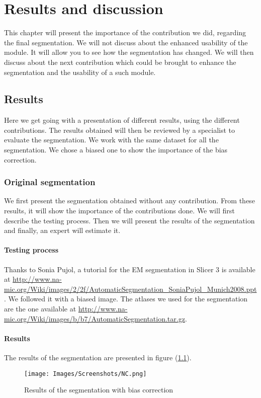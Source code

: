 \chapter{Results and discussion}\label{sec:results}
This chapter will present the importance of the contribution we did, regarding the final segmentation. We will not discuss about the enhanced usability of the module. It will allow you to see how the segmentation has changed. We will then discuss about the next contribution which could be brought to enhance the segmentation and the usability of a such module. 

%
\section{Results}
%
Here we get going with a presentation of different results, using the different contributions. The results obtained will then be reviewed by a specialist to evaluate the segmentation. We work with the same dataset for all the segmentation. We chose a biased one to show the importance of the bias correction.
%
\subsection{Original segmentation}
We first present the segmentation obtained without any contribution. From these results, it will show the importance of the contributions done. We will first describe the testing process. Then we will present the results of the segmentation and finally, an expert will estimate it.
\subsubsection{Testing process}
Thanks to Sonia Pujol, a tutorial for the EM segmentation in Slicer 3 is available at \url{http://www.na-mic.org/Wiki/images/2/2f/AutomaticSegmentation_SoniaPujol_Munich2008.ppt}. We followed it with a biased image. The atlases we used for the segmentation are the one available at \url{http://www.na-mic.org/Wiki/images/b/b7/AutomaticSegmentation.tar.gz}.

\subsubsection{Results}
The results of the segmentation are presented in figure (\ref{fig:NC}).
  \begin{figure}\centering
  \texttt{[image: Images/Screenshots/NC.png]}
  \caption{Results of the segmentation with bias correction}\label{fig:NC}
  \end{figure}
  
